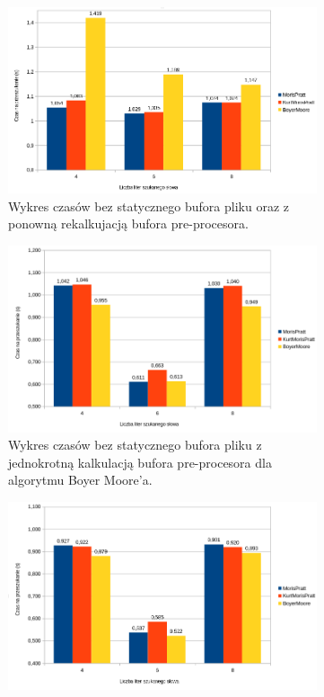 \begin{figure}
\centering
\begin{subfigure}{0.7\textwidth}
    \includegraphics[width=\textwidth]{./images/GraphFirstAttempt.png}
    \caption{Wykres czasów bez statycznego bufora pliku oraz z ponowną 
    rekalkujacją bufora pre-procesora.}
    \label{fig:GraphFirstAttempt}
\end{subfigure}
\begin{subfigure}{0.7\textwidth}
    \includegraphics[width=\textwidth]{./images/GraphPreAllocBM.png}
    \caption{Wykres czasów bez statycznego bufora pliku z jednokrotną kalkulacją
     bufora pre-procesora dla algorytmu Boyer Moore'a. }
    \label{fig:GraphPreAllocBM}
\end{subfigure}
\begin{subfigure}{0.7\textwidth}
    \includegraphics[width=\textwidth]{./images/GraphStaticPreallocAndFileBuffer.png}

\end{subfigure}
\end{figure}
